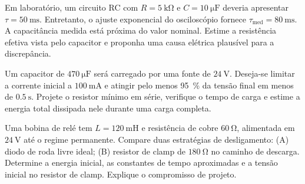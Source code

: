 
\blocodesafio
\begin{questao}[4]{}

Em laboratório, um circuito RC com $R=\SI{5}{\kilo\ohm}$ e
$C=\SI{10}{\micro\farad}$ deveria apresentar $\tau=\SI{50}{\milli\second}$.
Entretanto, o ajuste exponencial do osciloscópio fornece
$\tau_{\mathrm{med}}=\SI{80}{\milli\second}$. A capacitância medida está
próxima do valor nominal. Estime a resistência efetiva vista pelo capacitor e proponha
uma causa elétrica plausível para a discrepância.


\end{questao}
\begin{questao}[4]{}

Um capacitor de $\SI{470}{\micro\farad}$ será carregado por uma fonte de
$\SI{24}{\volt}$. Deseja-se limitar a corrente inicial a
$\SI{100}{\milli\ampere}$ e atingir pelo menos \SI{95}{\percent} da tensão final
em menos de $\SI{0.5}{\second}$. Projete o resistor mínimo em série, verifique o
tempo de carga e estime a energia total dissipada nele durante uma carga completa.


\end{questao}
\begin{questao}[4]{}

Uma bobina de relé tem $L=\SI{120}{\milli\henry}$ e resistência de cobre
$\SI{60}{\ohm}$, alimentada em $\SI{24}{\volt}$ até o regime permanente.
Compare duas estratégias de desligamento: (A) diodo de roda livre ideal; (B)
resistor de clamp de $\SI{180}{\ohm}$ no caminho de descarga. Determine a energia
inicial, as constantes de tempo aproximadas e a tensão inicial no resistor de
clamp. Explique o compromisso de projeto.


\end{questao}
